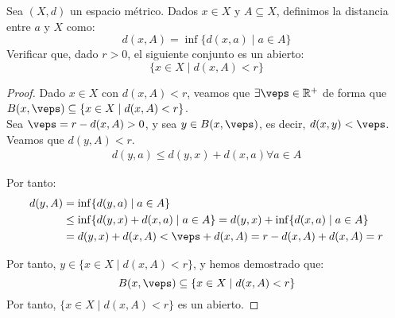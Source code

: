 \documentclass[12pt]{article}
\begin{document}
\begin{ejercicio}
    Sea $(X,d)$ un espacio métrico. Dados $x\in X$ y $A\subseteq X$, definimos la distancia entre $a$ y $X$ como:
    \begin{equation*}
        d(x,A) = \inf\{d(x,a) \mid a\in A\}
    \end{equation*}
    Verificar que, dado $r>0$, el siguiente conjunto es un abierto:
    \begin{equation*}
        \{x\in X\mid d(x,A) < r\}
    \end{equation*}
\end{ejercicio}
\begin{proof}
    Dado $x\in X$ con $d(x,A) < r$, veamos que $\exists \veps\in \mathbb{R}^+$ de forma que $B(x,\veps) \subseteq \{x\in X\mid d(x,A) < r\}$.\\

    Sea $\veps=r-d(x,A)>0$, y sea $y\in B(x,\veps)$, es decir, $d(x,y) < \veps$. Veamos que $d(y,A) < r$.
    \begin{align*}
        d(y,a) \leq d(y,x) + d(x,a) \forall a\in A
    \end{align*}

    Por tanto:
    \begin{align*}
        d(y,A) &= \inf\{d(y,a) \mid a\in A\} \\
        &\leq \inf\{d(y,x) + d(x,a) \mid a\in A\}
        = d(y,x) + \inf\{d(x,a) \mid a\in A\} \\
        &= d(y,x) + d(x,A)< \veps + d(x,A) = r-d(x,A) + d(x,A) = r
    \end{align*}

    Por tanto, $y\in \{x\in X\mid d(x,A) < r\}$, y hemos demostrado que:
    \begin{equation*}
        B(x,\veps) \subseteq \{x\in X\mid d(x,A) < r\}
    \end{equation*}
    Por tanto, $\{x\in X\mid d(x,A) < r\}$ es un abierto.
\end{proof}
\end{document}
